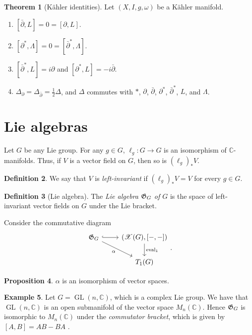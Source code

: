 \documentclass[10pt,letterpaper,cm]{nupset}
\theoremstyle{definition}
\newtheorem{defn}{Definition}[subsection]
\newtheorem{exmp}[defn]{Example}
\theoremstyle{theorem}
\newtheorem{theorem}[defn]{Theorem}
\newtheorem{prop}[defn]{Proposition}
\theoremstyle{remark}
\newcommand{\C}{\mathbb C}
\newcommand{\G}{\frak{G}}
\newcommand{\X}{\mathscr X}
\newcommand{\1}{\mathbb{1}}
\newcommand{\0}{\vec 0}
\DeclareMathOperator{\GL}{GL}
\DeclareMathOperator{\ev}{eval}
\newcommand{\be}{\begin{enumerate}}
\newcommand{\ee}{\end{enumerate}}
\begin{document}
\begin{theorem}[K\"ahler identities]\label{Kid} Let $\left(X, I, g, \omega\right)$ be a K\"ahler manifold.
\be
\item $\left[\bar{\partial}, L\right] =0 = \left[\partial, L\right]$.
\item $\left[\partial^{\ast}, \Lambda \right] =0 = \left[\bar{\partial}^{\ast}, \Lambda\right]$.
\item $\left[\bar{\partial}^{\ast}, L\right] =i\partial$ and $\left[\partial^{\ast}, L\right] = {-i\bar{\partial}}$.
\item $\Delta_{\partial} = \Delta_{\bar{\partial}} =\frac{1}{2}\Delta$, and $\Delta$ commutes with $\ast$, $\partial$, $\bar{\partial}$, $\partial^{\ast}$, $\bar{\partial}^{\ast}$, $L$, and $\Lambda$.
\ee
\end{theorem}

\section{Lie algebras}

Let $G$ be any Lie group. For any $g\in G$, $\ell_g : G \to G$ is an isomorphism of $\C$-manifolds. Thus, if $V$ is a vector field on $G$, then so is $\left(\ell_g\right)_{\ast}{V}$.

\begin{defn}
We say that $V$ is \textit{left-invariant} if $\left(\ell_g\right)_{\ast}{V} = V$ for every $g\in G$.
\end{defn}

\begin{defn}[Lie algebra]
The \textit{Lie algebra $\G_G$ of $G$} is the space of left-invariant vector fields on $G$ under the Lie bracket.
\end{defn}

Consider the commutative diagram
\[
\begin{tikzcd}
\G_G \arrow[r, hook] \arrow[rd, "\alpha"'] & {\left(\X(G), [{-},{-}]\right)} \arrow[d, "\ev_1"] \\
                                         & T_1(G)                                   
\end{tikzcd}.
\]

\begin{prop}
$\alpha$ is an isomorphism of vector spaces. 
\end{prop}


\begin{exmp}
Let $G = \GL(n, \C)$, which is a complex Lie group. We have that $\GL(n, \C)$ is an open submanifold of the vector space $M_n(\C)$. Hence $\G_G$ is  isomorphic to $M_n(\C)$ under the \textit{commutator bracket}, which is given by $\left[A,B\right]= AB -BA$ .
\end{exmp}
\end{document}
